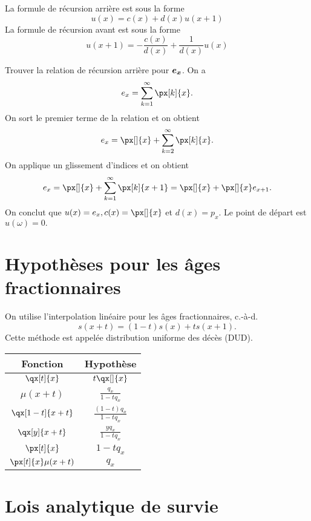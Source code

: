 \begin{definition}{}{}
	La formule de récursion arrière est sous la forme $$u(x) = c(x) + d(x) u(x + 1)$$\tcblower
	La formule de récursion avant est sous la forme $$u(x + 1) = -\frac{c(x)}{d(x)} + \frac{1}{d(x)}u(x)$$
\end{definition}

\begin{example}{Trouver la relation de récursion arrière pour $\displaystyle \boldsymbol{e_x}$. }{}
	On a $$e_x = \sum_{k = 1}^{\infty} \px[k]{x}.$$
	On sort le premier terme de la relation et on obtient
	$$e_x = \px[]{x} + \sum_{k = 2}^{\infty} \px[k]{x}.$$
	On applique un glissement d'indices et on obtient
	$$e_x = \px[]{x} + \sum_{k = 1}^{\infty} \px[k]{x + 1} = \px[]{x} + \px[]{x}e_{x+1}.$$
	On conclut que $u(x) = e_x, c(x) = \px[]{x}$ et $d(x) = p_x$. Le point de départ est $u(\omega) = 0.$
\end{example}

\section{Hypothèses pour les âges fractionnaires}

On utilise l'interpolation linéaire pour les âges fractionnaires, c.-à-d. 
$$s(x + t) = (1-t)s(x) + ts(x + 1).$$
Cette méthode est appelée distribution uniforme des décès (DUD).

\begin{center}
	\begin{tabular}{cc}
		\hline
		Fonction        &         Hypothèse         \\ \hline
		$\qx[t]{x}$       &        $\displaystyle t\qx[]{x}$        \\
		$\mu(x + t)$      &   $\displaystyle \frac{q_x}{1-tq_x}$    \\
		$\qx[1-t]{x+t}$     & $\displaystyle \frac{(1-t)q_x}{1-tq_x}$ \\
		$\qx[y]{x + t}$     &  $\displaystyle \frac{yq_x}{1 - tq_x}$  \\
		$\px[t]{x}$       &        $1 - tq_x$         \\
		$\px[t]{x} \mu(x + t)$ &           $q_x$           \\ \hline
	\end{tabular}
\end{center}

\section{Lois analytique de survie}

